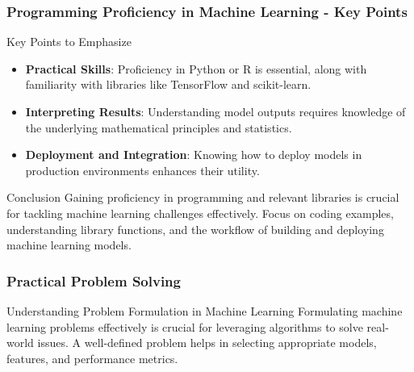 \documentclass{beamer}
\begin{document}
\begin{frame}[fragile]
    \frametitle{Programming Proficiency in Machine Learning - Key Points}
    \begin{block}{Key Points to Emphasize}
        \begin{itemize}
            \item \textbf{Practical Skills}: Proficiency in Python or R is essential, along with familiarity with libraries like TensorFlow and scikit-learn.
            \item \textbf{Interpreting Results}: Understanding model outputs requires knowledge of the underlying mathematical principles and statistics.
            \item \textbf{Deployment and Integration}: Knowing how to deploy models in production environments enhances their utility.
        \end{itemize}
    \end{block}

    \begin{block}{Conclusion}
        Gaining proficiency in programming and relevant libraries is crucial for tackling machine learning challenges effectively. Focus on coding examples, understanding library functions, and the workflow of building and deploying machine learning models.
    \end{block}
\end{frame}

\begin{frame}[fragile]
    \frametitle{Practical Problem Solving}
    \begin{block}{Understanding Problem Formulation in Machine Learning}
        Formulating machine learning problems effectively is crucial for leveraging algorithms to solve real-world issues. A well-defined problem helps in selecting appropriate models, features, and performance metrics.
    \end{block}
\end{frame}
\end{document}
